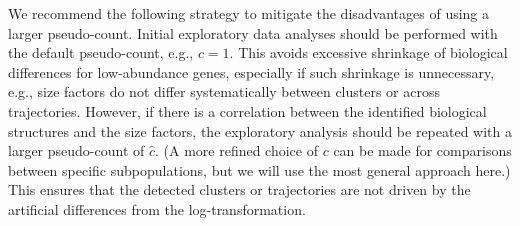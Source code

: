 \documentclass[10pt,letterpaper]{article}
\begin{document}
We recommend the following strategy to mitigate the disadvantages of using a larger pseudo-count.
Initial exploratory data analyses should be performed with the default pseudo-count, e.g., $c=1$.
This avoids excessive shrinkage of biological differences for low-abundance genes, especially if such shrinkage is unnecessary, 
e.g., size factors do not differ systematically between clusters or across trajectories.
However, if there is a correlation between the identified biological structures and the size factors, the exploratory analysis should be repeated with a larger pseudo-count of $\hat c$. 
(A more refined choice of $c$ can be made for comparisons between specific subpopulations, but we will use the most general approach here.)
This ensures that the detected clusters or trajectories are not driven by the artificial differences from the log-transformation.



\end{document}
